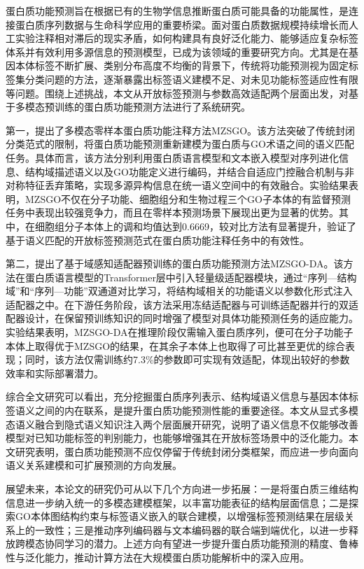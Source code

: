 
\begin{conclusions}
蛋白质功能预测旨在根据已有的生物学信息推断蛋白质可能具备的功能属性，是连接蛋白质序列数据与生命科学应用的重要桥梁。面对蛋白质数据规模持续增长而人工实验注释相对滞后的现实矛盾，如何构建具有良好泛化能力、能够适应复杂标签体系并有效利用多源信息的预测模型，已成为该领域的重要研究方向。尤其是在基因本体标签不断扩展、类别分布高度不均衡的背景下，传统将功能预测视为固定标签集分类问题的方法，逐渐暴露出标签语义建模不足、对未见功能标签适应性有限等问题。围绕上述挑战，本文从开放标签预测与参数高效适配两个层面出发，对基于多模态预训练的蛋白质功能预测方法进行了系统研究。

第一，提出了多模态零样本蛋白质功能注释方法MZSGO。该方法突破了传统封闭分类范式的限制，将蛋白质功能预测重新建模为蛋白质与GO术语之间的语义匹配任务。具体而言，该方法分别利用蛋白质语言模型和文本嵌入模型对序列进化信息、结构域描述语义以及GO功能定义进行编码，并结合自适应门控融合机制与非对称特征丢弃策略，实现多源异构信息在统一语义空间中的有效融合。实验结果表明，MZSGO不仅在分子功能、细胞组分和生物过程三个GO子本体的有监督预测任务中表现出较强竞争力，而且在零样本预测场景下展现出更为显著的优势。其中，在细胞组分子本体上的调和均值达到0.6669，较对比方法有显著提升，验证了基于语义匹配的开放标签预测范式在蛋白质功能注释任务中的有效性。

第二，提出了基于域感知适配器预训练的蛋白质功能预测方法MZSGO-DA。该方法在蛋白质语言模型的Transformer层中引入轻量级适配器模块，通过“序列—结构域”和“序列—功能”双通道对比学习，将结构域相关的功能语义以参数化形式注入适配器之中。在下游任务阶段，该方法采用冻结适配器与可训练适配器并行的双适配器设计，在保留预训练知识的同时增强了模型对具体功能预测任务的适应能力。实验结果表明，MZSGO-DA在推理阶段仅需输入蛋白质序列，便可在分子功能子本体上取得优于MZSGO的结果，在其余子本体上也取得了可比甚至更优的综合表现；同时，该方法仅需训练约7.3\%的参数即可实现有效适配，体现出较好的参数效率和实际部署潜力。

综合全文研究可以看出，充分挖掘蛋白质序列表示、结构域语义信息与基因本体标签语义之间的内在联系，是提升蛋白质功能预测性能的重要途径。本文从显式多模态语义融合到隐式语义知识注入两个层面展开研究，说明了语义信息不仅能够改善模型对已知功能标签的判别能力，也能够增强其在开放标签场景中的泛化能力。本文研究表明，蛋白质功能预测不应仅停留于传统封闭分类框架，而应进一步向面向语义关系建模和可扩展预测的方向发展。

展望未来，本论文的研究仍可从以下几个方向进一步拓展：一是将蛋白质三维结构信息进一步纳入统一的多模态建模框架，以丰富功能表征的结构层面信息；二是探索GO本体图结构约束与标签语义嵌入的联合建模，以增强标签预测结果在层级关系上的一致性；三是推动序列编码器与文本编码器的联合端到端优化，以进一步释放跨模态协同学习的潜力。上述方向有望进一步提升蛋白质功能预测的精度、鲁棒性与泛化能力，推动计算方法在大规模蛋白质功能解析中的深入应用。

\end{conclusions}